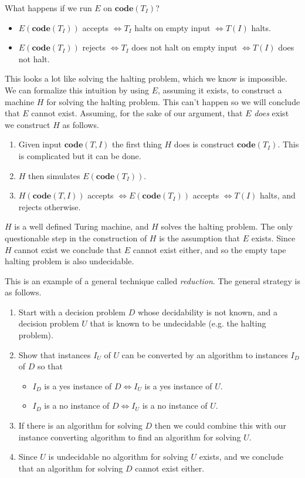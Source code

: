 \documentclass{article}
\theoremstyle{plain}
\theoremstyle{definition}
\newcommand{\co}{\mathbf{code}}
\begin{document}
What happens if we run $E$ on $\co(T_I)$?
\begin{itemize}
\item $E(\co(T_I))$ accepts $\iff T_I$ halts on empty input $\iff T(I)$ halts.
\item $E(\co(T_I))$ rejects $\iff T_I$ does not halt on empty input $\iff T(I)$ does not halt.
\end{itemize}

This looks a lot like solving the halting problem, which we know is impossible. We can formalize this intuition by using $E$, assuming it exists, to construct a machine $H$ for solving the halting problem. This can't happen so we will conclude that $E$ cannot exist. Assuming, for the sake of our argument, that $E$ \emph{does} exist we construct $H$ as follows.

\begin{enumerate}
\item Given input $\co(T,I)$ the first thing $H$ does is construct $\co(T_I)$. This is complicated but it can be done.
\item $H$ then simulates $E(\co(T_I))$.
\item $H(\co(T,I))$ accepts $\iff E(\co(T_I))$ accepts $\iff T(I)$ halts, and rejects otherwise. 
\end{enumerate}

$H$ is a well defined Turing machine, and $H$ solves the halting problem. The only questionable step in the construction of $H$ is the assumption that $E$ exists. Since $H$ cannot exist we conclude that $E$ cannot exist either, and so the empty tape halting problem is also undecidable.

This is an example of a general technique called \emph{reduction}. The general strategy is as follows.

\begin{enumerate}
\item Start with a decision problem $D$ whose decidability is not known, and a decision problem $U$ that is known to be undecidable (e.g. the halting problem).
\item Show that instances $I_U$ of $U$ can be converted by an algorithm to instances $I_D$ of $D$ so that
\begin{itemize}
\item $I_D$ is a yes instance of $D\iff I_U$ is a yes instance of $U$.
\item $I_D$ is a no instance of $D\iff I_U$ is a no instance of $U$.
\end{itemize}
\item If there is an algorithm for solving $D$ then we could combine this with our instance converting algorithm to find an algorithm for solving $U$.
\item Since $U$ is undecidable no algorithm for solving $U$ exists, and we conclude that an algorithm for solving $D$ cannot exist either.
\end{enumerate} 
\end{document}
